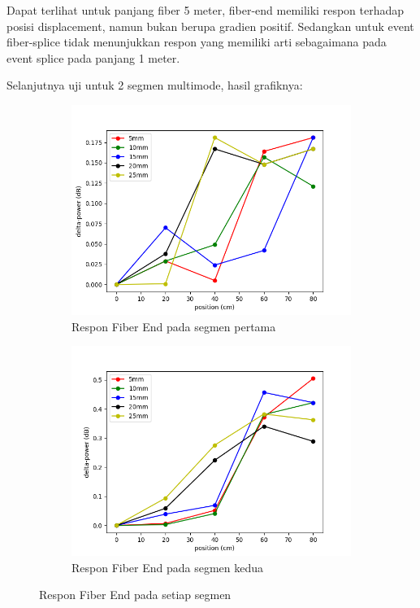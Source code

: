 \documentclass[12pt]{article}
\begin{document}
	Dapat terlihat untuk panjang fiber 5 meter, fiber-end memiliki respon terhadap posisi displacement, namun bukan berupa gradien positif. 
	Sedangkan untuk event fiber-splice tidak menunjukkan respon yang memiliki arti sebagaimana pada event splice pada panjang 1 meter.
	
	Selanjutnya uji untuk 2 segmen multimode, hasil grafiknya:
	
	\begin{figure}[!h]
		\centering
		\captionsetup{justification=centering}
		\begin{subfigure}[h]{0.8\textwidth}
			\includegraphics[width=\textwidth]{images/Bab_4/fiber_A_end}	
			\caption{\small{Respon Fiber End pada segmen pertama}}		
		\end{subfigure}
		\begin{subfigure}[h]{0.8\textwidth}
			\includegraphics[width=\linewidth]{images/Bab_4/fiber_B_end}
			\caption{\small{Respon Fiber End pada segmen kedua}}			
		\end{subfigure}
		\caption[belum ada judul]{\small{Respon Fiber End pada setiap segmen}}
	\end{figure}
\end{document}
